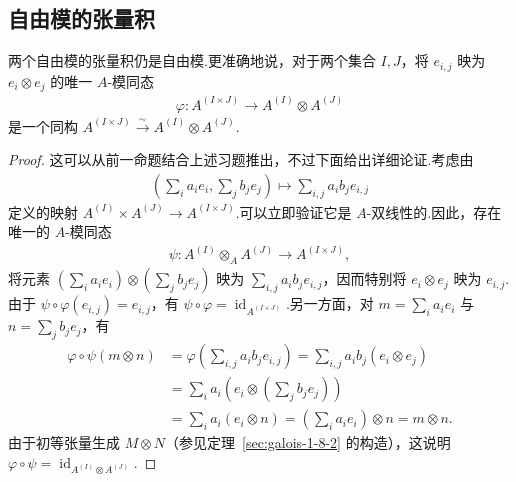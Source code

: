 \subsection{自由模的张量积}\label{sec:galois-1-8-5}
\begin{proposition*}
两个自由模的张量积仍是自由模.更准确地说，对于两个集合 $I,J$，将 $e_{i,j}$ 映为 $e_i\otimes e_j$ 的唯一 $A$-模同态
\begin{align*}
\varphi:A^{(I\times J)}\longrightarrow A^{(I)}\otimes A^{(J)}
\end{align*}
是一个同构 $A^{(I\times J)}\xrightarrow{\sim}A^{(I)}\otimes A^{(J)}$.
\end{proposition*}
\begin{proof}
这可以从前一命题结合上述习题推出，不过下面给出详细论证.考虑由
\begin{align*}
\left(\sum_i a_ie_i,\sum_j b_je_j\right)\longmapsto\sum_{i,j}a_ib_je_{i,j}
\end{align*}
定义的映射 $A^{(I)}\times A^{(J)}\longrightarrow A^{(I\times J)}$.可以立即验证它是 $A$-双线性的.因此，存在唯一的 $A$-模同态
\begin{align*}
\psi:A^{(I)}\otimes_A A^{(J)}\longrightarrow A^{(I\times J)},
\end{align*}
将元素 $(\sum_i a_ie_i)\otimes(\sum_j b_je_j)$ 映为 $\sum_{i,j}a_ib_je_{i,j}$，因而特别将 $e_i\otimes e_j$ 映为 $e_{i,j}$.由于 $\psi\circ\varphi(e_{i,j})=e_{i,j}$，有 $\psi\circ\varphi=\operatorname{id}_{A^{(I\times J)}}$.另一方面，对 $m=\sum_i a_ie_i$ 与 $n=\sum_j b_je_j$，有
\begin{align*}
\varphi\circ\psi(m\otimes n)&=\varphi\left(\sum_{i,j}a_ib_je_{i,j}\right)=\sum_{i,j}a_ib_j(e_i\otimes e_j)\\
&=\sum_i a_i\left(e_i\otimes\left(\sum_j b_je_j\right)\right)\\
&=\sum_i a_i(e_i\otimes n)=\left(\sum_i a_ie_i\right)\otimes n=m\otimes n.
\end{align*}
由于初等张量生成 $M\otimes N$（参见定理~\ref{sec:galois-1-8-2} 的构造），这说明 $\varphi\circ\psi=\operatorname{id}_{A^{(I)}\otimes A^{(J)}}$.
\end{proof}
